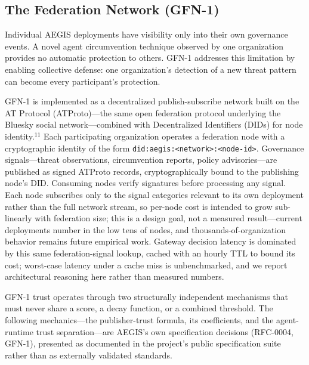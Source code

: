 \documentclass{IEEEcsmag}
\begin{document}
\subsection{The Federation Network (GFN-1)}

Individual AEGIS deployments have visibility only into their own governance events. A novel agent circumvention technique observed by one organization provides no automatic protection to others. GFN-1 addresses this limitation by enabling collective defense: one organization's detection of a new threat pattern can become every participant's protection.

GFN-1 is implemented as a decentralized publish-subscribe network built on the AT Protocol (ATProto)---the same open federation protocol underlying the Bluesky social network---combined with Decentralized Identifiers (DIDs) for node identity.$^{11}$ Each participating organization operates a federation node with a cryptographic identity of the form \texttt{did:aegis:<network>:<node-id>}. Governance signals---threat observations, circumvention reports, policy advisories---are published as signed ATProto records, cryptographically bound to the publishing node's DID. Consuming nodes verify signatures before processing any signal. Each node subscribes only to the signal categories relevant to its own deployment rather than the full network stream, so per-node cost is intended to grow sub-linearly with federation size; this is a design goal, not a measured result---current deployments number in the low tens of nodes, and thousands-of-organization behavior remains future empirical work. Gateway decision latency is dominated by this same federation-signal lookup, cached with an hourly TTL to bound its cost; worst-case latency under a cache miss is unbenchmarked, and we report architectural reasoning here rather than measured numbers.

GFN-1 trust operates through two structurally independent mechanisms that must never share a score, a decay function, or a combined threshold. The following mechanics---the publisher-trust formula, its coefficients, and the agent-runtime trust separation---are AEGIS's own specification decisions (RFC-0004, GFN-1), presented as documented in the project's public specification suite rather than as externally validated standards.
\end{document}
